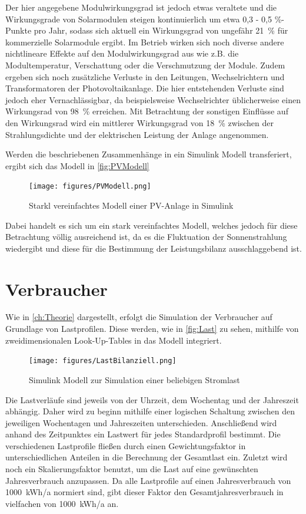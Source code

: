 Der hier angegebene Modulwirkungsgrad ist jedoch etwas veraltete und die Wirkungsgrade von Solarmodulen steigen kontinuierlich um etwa 0,3 - 0,5 \%-Punkte pro Jahr, sodass sich aktuell ein Wirkungsgrad von ungefähr 21~\% für kommerzielle Solarmodule ergibt. Im Betrieb wirken sich noch diverse andere nichtlineare Effekte auf den Modulwirkungsgrad aus wie z.B. die Modultemperatur, Verschattung oder die Verschmutzung der Module. Zudem ergeben sich noch zusätzliche Verluste in den Leitungen, Wechselrichtern und Transformatoren der Photovoltaikanlage. Die hier entstehenden Verluste sind jedoch eher Vernachlässigbar, da beispielsweise Wechselrichter üblicherweise einen Wirkungsrad von 98~\% erreichen. Mit Betrachtung der sonstigen Einflüsse auf den Wirkungsrad wird ein mittlerer Wirkungsgrad von 18~\% zwischen der Strahlungsdichte und der elektrischen Leistung der Anlage angenommen. \cite{FaktenPV} 

Werden die beschriebenen Zusammenhänge in ein Simulink Modell transferiert, ergibt sich das Modell in \autoref{fig:PVModell}

\begin{figure}[H]
	\centering
	\texttt{[image: figures/PVModell.png]}
	\caption{Starkl vereinfachtes Modell einer PV-Anlage in Simulink}
	\label{fig:PVModell}
\end{figure}

Dabei handelt es sich um ein stark vereinfachtes Modell, welches jedoch für diese Betrachtung völlig ausreichend ist, da es die Fluktuation der Sonnenstrahlung wiedergibt und diese für die Bestimmung der Leistungsbilanz ausschlaggebend ist.

\section{Verbraucher}

Wie in \autoref{ch:Theorie} dargestellt, erfolgt die Simulation der Verbraucher auf Grundlage von Lastprofilen. Diese werden, wie in \autoref{fig:Last} zu sehen, mithilfe von zweidimensionalen Look-Up-Tables in das Modell integriert. 

\begin{figure}[H]
	\centering
	\texttt{[image: figures/LastBilanziell.png]}
	\caption{Simulink Modell zur Simulation einer beliebigen Stromlast}
	\label{fig:Last}
\end{figure}

Die Lastverläufe sind jeweils von der Uhrzeit, dem Wochentag und der Jahreszeit abhängig. Daher wird zu beginn mithilfe einer logischen Schaltung zwischen den jeweiligen Wochentagen und Jahreszeiten unterschieden. Anschließend wird anhand des Zeitpunktes ein Lastwert für jedes Standardprofil bestimmt. Die verschiedenen Lastprofile fließen durch einen Gewichtungsfaktor in unterschiedlichen Anteilen in die Berechnung der Gesamtlast ein. Zuletzt wird noch ein Skalierungsfaktor benutzt, um die Last auf eine gewünschten Jahresverbrauch anzupassen. Da alle Lastprofile auf einen Jahresverbrauch von 1000~kWh/a normiert sind, gibt dieser Faktor den Gesamtjahresverbrauch in vielfachen von 1000~kWh/a an.
